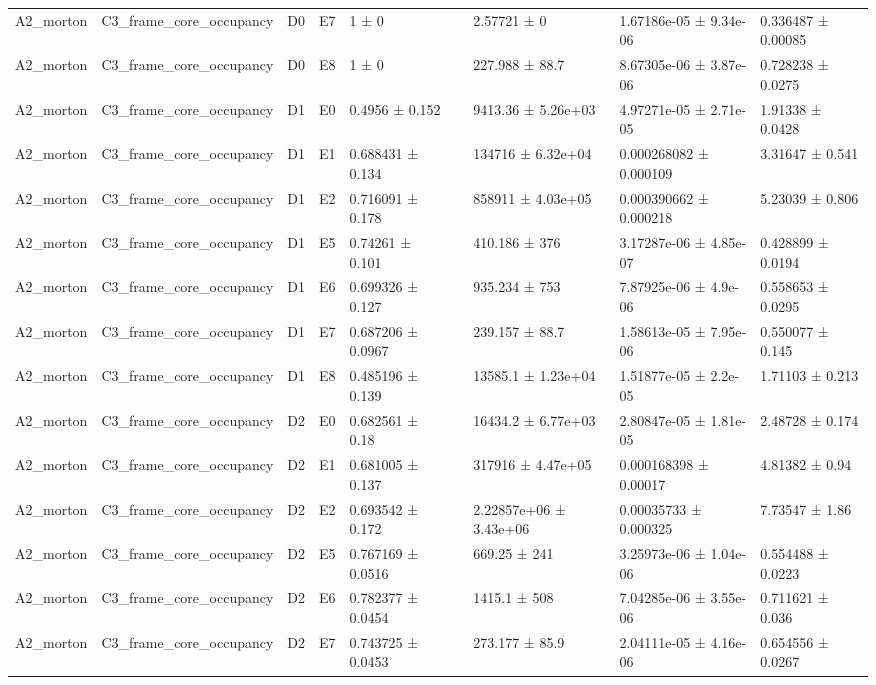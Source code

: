 \begin{table}
\begin{tabular}{lllllllll}
A2\_morton & C3\_frame\_core\_occupancy & D0 & E7 & 1 ± 0 &  & 2.57721 ± 0 & 1.67186e-05 ± 9.34e-06 & 0.336487 ± 0.00085 \\
A2\_morton & C3\_frame\_core\_occupancy & D0 & E8 & 1 ± 0 &  & 227.988 ± 88.7 & 8.67305e-06 ± 3.87e-06 & 0.728238 ± 0.0275 \\
A2\_morton & C3\_frame\_core\_occupancy & D1 & E0 & 0.4956 ± 0.152 &  & 9413.36 ± 5.26e+03 & 4.97271e-05 ± 2.71e-05 & 1.91338 ± 0.0428 \\
A2\_morton & C3\_frame\_core\_occupancy & D1 & E1 & 0.688431 ± 0.134 &  & 134716 ± 6.32e+04 & 0.000268082 ± 0.000109 & 3.31647 ± 0.541 \\
A2\_morton & C3\_frame\_core\_occupancy & D1 & E2 & 0.716091 ± 0.178 &  & 858911 ± 4.03e+05 & 0.000390662 ± 0.000218 & 5.23039 ± 0.806 \\
A2\_morton & C3\_frame\_core\_occupancy & D1 & E5 & 0.74261 ± 0.101 &  & 410.186 ± 376 & 3.17287e-06 ± 4.85e-07 & 0.428899 ± 0.0194 \\
A2\_morton & C3\_frame\_core\_occupancy & D1 & E6 & 0.699326 ± 0.127 &  & 935.234 ± 753 & 7.87925e-06 ± 4.9e-06 & 0.558653 ± 0.0295 \\
A2\_morton & C3\_frame\_core\_occupancy & D1 & E7 & 0.687206 ± 0.0967 &  & 239.157 ± 88.7 & 1.58613e-05 ± 7.95e-06 & 0.550077 ± 0.145 \\
A2\_morton & C3\_frame\_core\_occupancy & D1 & E8 & 0.485196 ± 0.139 &  & 13585.1 ± 1.23e+04 & 1.51877e-05 ± 2.2e-05 & 1.71103 ± 0.213 \\
A2\_morton & C3\_frame\_core\_occupancy & D2 & E0 & 0.682561 ± 0.18 &  & 16434.2 ± 6.77e+03 & 2.80847e-05 ± 1.81e-05 & 2.48728 ± 0.174 \\
A2\_morton & C3\_frame\_core\_occupancy & D2 & E1 & 0.681005 ± 0.137 &  & 317916 ± 4.47e+05 & 0.000168398 ± 0.00017 & 4.81382 ± 0.94 \\
A2\_morton & C3\_frame\_core\_occupancy & D2 & E2 & 0.693542 ± 0.172 &  & 2.22857e+06 ± 3.43e+06 & 0.00035733 ± 0.000325 & 7.73547 ± 1.86 \\
A2\_morton & C3\_frame\_core\_occupancy & D2 & E5 & 0.767169 ± 0.0516 &  & 669.25 ± 241 & 3.25973e-06 ± 1.04e-06 & 0.554488 ± 0.0223 \\
A2\_morton & C3\_frame\_core\_occupancy & D2 & E6 & 0.782377 ± 0.0454 &  & 1415.1 ± 508 & 7.04285e-06 ± 3.55e-06 & 0.711621 ± 0.036 \\
A2\_morton & C3\_frame\_core\_occupancy & D2 & E7 & 0.743725 ± 0.0453 &  & 273.177 ± 85.9 & 2.04111e-05 ± 4.16e-06 & 0.654556 ± 0.0267 \\

\end{tabular}
\end{table}
